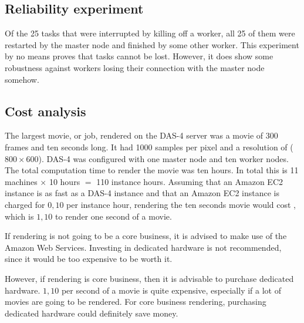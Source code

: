 \subsection{Reliability experiment}
Of the 25 tasks that were interrupted by killing off a worker, all 25 of them were restarted by the master node and finished by some other worker.
This experiment by no means proves that tasks cannot be lost.
However, it does show some robustness against workers losing their connection with the master node somehow.

\subsection{Cost analysis}
The largest movie, or job, rendered on the DAS-4 server was a movie of 300 frames and ten seconds long.
It had 1000 samples per pixel and a resolution of ($800 \times 600$).
DAS-4 was configured with one master node and ten worker nodes.
The total computation  time to render the movie was ten hours.
In total this is 11 machines $\times$ 10 hours $=$ 110 instance hours.
Assuming that an Amazon EC2 instance is as fast as a DAS-4 instance and that an Amazon EC2 instance is charged for \EUR$0,10$ per instance hour, rendering the ten seconds movie would cost , which is \EUR$1,10$ to render one second of a movie.

If rendering is not going to be a core business, it is advised to make use of the Amazon Web Services.
Investing in dedicated hardware is not recommended, since it would be too expensive to be worth it.

However, if rendering is core business, then it is advisable to purchase dedicated hardware.
\EUR$1,10$ per second of a movie is quite expensive, especially if a lot of movies are going to be rendered.
For core business rendering, purchasing dedicated hardware could definitely save money.